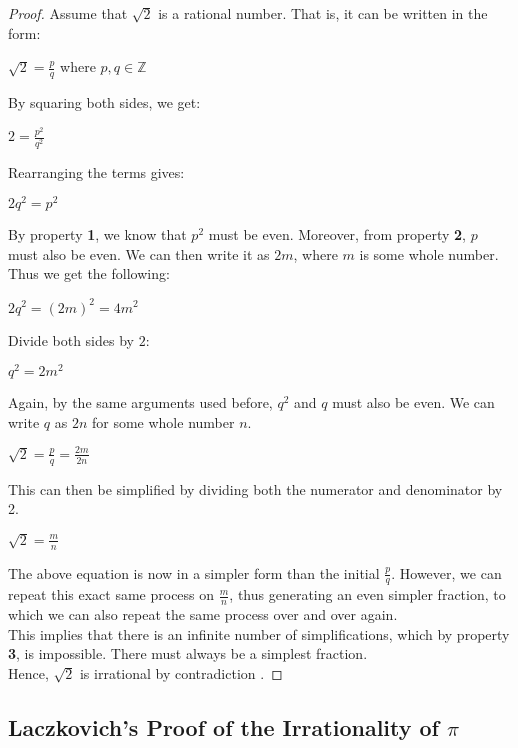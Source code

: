 \documentclass[12pt]{article}
\begin{document}
\begin{proof}
\noindent Assume that $\sqrt{2}$ is a rational number. That is, it can be written in the form:
\begin{center}
    $\sqrt{2} = \frac{p}{q}$ where $p, q \in \mathbb{Z}$
\end{center}
By squaring both sides, we get:
\begin{center}
    $2 = \frac{p^2}{q^2}$
\end{center}
Rearranging the terms gives:
\begin{center}
    $2q^2 = p^2$
\end{center}
By property \textbf{1}, we know that $p^2$ must be even. Moreover, from property \textbf{2}, $p$ must also be even. We can then write it as $2m$, where $m$ is some whole number. Thus we get the following:
\begin{center}
    $2q^2 = (2m)^2 = 4m^2$
\end{center}
Divide both sides by $2$:
\begin{center}
    $q^2 = 2m^2$
\end{center}
Again, by the same arguments used before, $q^2$ and $q$ must also be even. We can write $q$ as $2n$ for some whole number $n$.
\begin{center}
    $\sqrt{2} = \frac{p}{q} = \frac{2m}{2n}$
\end{center}
This can then be simplified by dividing both the numerator and denominator by 2.
\begin{center}
    $\sqrt{2} = \frac{m}{n}$
\end{center}
The above equation is now in a simpler form than the initial $\frac{p}{q}$. However, we can repeat this exact same process on $\frac{m}{n}$, thus generating an even simpler fraction, to which we can also repeat the same process over and over again.\\

\noindent This implies that there is an infinite number of simplifications, which by property \textbf{3}, is impossible. There must always be a simplest fraction.\\

\noindent Hence, $\sqrt{2}$ is irrational by contradiction \cite{singh1997fermat}.

\end{proof}


\subsection{Laczkovich's Proof of the Irrationality of $\pi$}\label{appendix:3}
\end{document}
